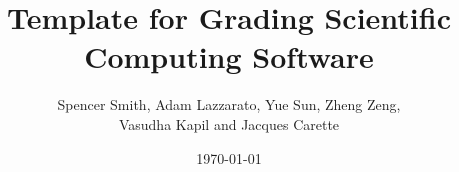 \documentclass[12pt]{article}
\begin{document}
\title{Template for Grading Scientific Computing Software} 
\author{Spencer Smith, Adam Lazzarato, Yue Sun, Zheng Zeng,\\ Vasudha Kapil and Jacques Carette}
\date{\today}
	
\maketitle


\end{document}
